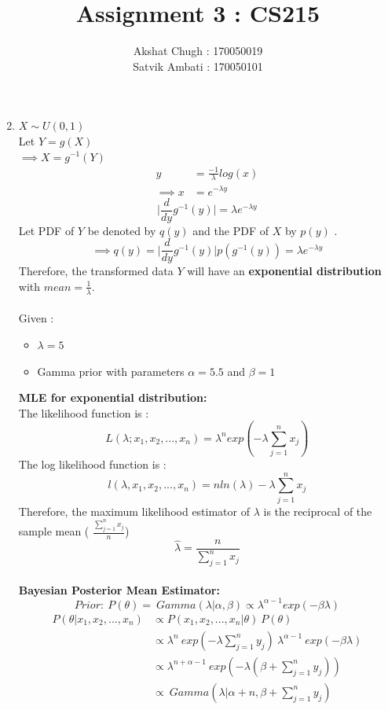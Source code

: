 \documentclass{article}
\title{Assignment 3 : CS215}
\author{Akshat Chugh : 170050019 \\ Satvik Ambati : 170050101}
\begin{document}
\maketitle
\begin{enumerate}
	\setcounter{enumi}{1}
	\item $X \sim U(0,1)$ \\
	Let $Y = g(X)$ \\
	$\implies X = g^{-1}(Y)$ 
	\begin{align}
	y &= \frac{-1}{\lambda} log(x) \\
	\implies  x &=  e^{-\lambda y}
	\end{align}
	$$  \Big| \frac{d}{dy} g^{-1}(y) \Big| = \lambda e^{-\lambda y}$$
	Let PDF of $Y$ be denoted by $q(y)$ and the PDF of $X$ by $p(y)$ .
	$$ \implies q(y) = \Big| \frac{d}{dy} g^{-1}(y) \Big| p(g^{-1}(y)) = \lambda e^{-\lambda y}$$
	Therefore, the transformed data $Y$ will have an \textbf{exponential distribution} with $mean = \frac{1}{\lambda}$. \\
	\\ Given :
	\begin{itemize}
		\item $\lambda = 5$
		\item Gamma prior with parameters $\alpha = 5.5$ and $\beta = 1$
	\end{itemize}
	\textbf{MLE for exponential distribution:} \\
	The likelihood function is : 
	$$L(\lambda; x_1, x_2,...,x_n) = \lambda^n exp( - \lambda \sum_{j=1}^{n} x_j)$$
	The log likelihood function is :
	$$ l(\lambda, x_1, x_2,...,x_n) = n ln(\lambda) - \lambda \sum_{j=1}^{n} x_j$$
	Therefore, the maximum likelihood estimator of $\lambda$ is the reciprocal of the sample mean ( $\frac{\sum_{j=1}^{n} x_j}{n}$)
	$$\hat{\lambda} = \frac{n}{\sum_{j=1}^{n} x_j}$$ \\
	\textbf{Bayesian Posterior Mean Estimator:}
	$$ Prior: \ P(\theta) = \ Gamma(\lambda | \alpha, \beta) \propto \lambda^{\alpha - 1} exp(-\beta \lambda) $$ 
	\begin{align*}
	P(\theta | x_1,x_2,...,x_n) &\propto P(x_1,x_2,...,x_n | \theta) \ P(\theta) \\
	&\propto \lambda^{n} \ exp(- \lambda \sum_{j=1}^{n} y_j) \ \lambda^{\alpha - 1} \ exp(-\beta \lambda)
	\\ &\propto \lambda^{n+\alpha-1} \ exp(- \lambda (\beta + \sum_{j=1}^{n} y_j)) \\
	&\propto \ Gamma(\lambda | \alpha + n, \beta + \sum_{j=1}^{n} y_j)
	\end{align*}

\end{enumerate}
\end{document}
